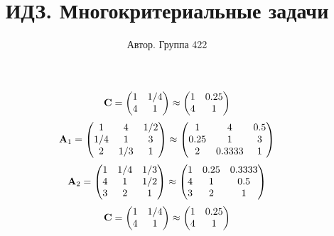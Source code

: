 \documentclass[10pt,a4paper]{article}
\title{ИДЗ. Многокритериальные задачи}
\author{Автор. Группа 422}
\begin{document}
	\maketitle
	
	\[
		\bold{C} = 
		\begin{pmatrix}
			{1}{} & {1} / {{4}} \\
			{{4}}{} & {1}{} \\
		\end{pmatrix}
		\approx
		\begin{pmatrix}
			1        & 0.25     \\
			4        & 1        \\
		\end{pmatrix}
	\]
	\[
		\bold{A}_{1} = 
		\begin{pmatrix}
			{1}{} & {{4}}{} & {1} / {{2}} \\
			{1} / {{4}} & {1}{} & {{3}}{} \\
			{{2}}{} & {1} / {{3}} & {1}{} \\
		\end{pmatrix}
		\approx
		\begin{pmatrix}
			1        & 4        & 0.5      \\
			0.25     & 1        & 3        \\
			2        & 0.3333   & 1        \\
		\end{pmatrix}
	\]
	\[
		\bold{A}_{2} = 
		\begin{pmatrix}
			{1}{} & {1} / {{4}} & {1} / {{3}} \\
			{{4}}{} & {1}{} & {1} / {{2}} \\
			{{3}}{} & {{2}}{} & {1}{} \\
		\end{pmatrix}
		\approx
		\begin{pmatrix}
			1        & 0.25     & 0.3333   \\
			4        & 1        & 0.5      \\
			3        & 2        & 1        \\
		\end{pmatrix}
	\]
	\[
		\bold{C} = 
		\begin{pmatrix}
			{1}{} & {1} / {{4}} \\
			{{4}}{} & {1}{} \\
		\end{pmatrix}
		\approx
		\begin{pmatrix}
			1        & 0.25     \\
			4        & 1        \\
		\end{pmatrix}
	\]
\end{document}
